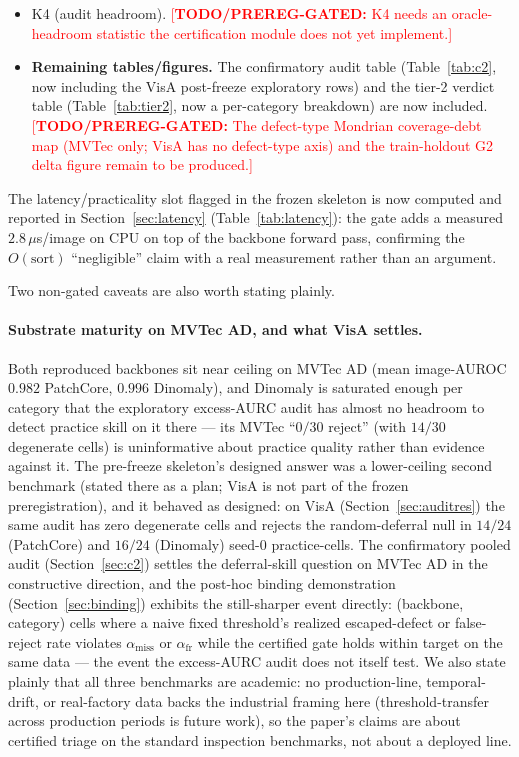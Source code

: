 \documentclass[11pt]{article}
\newcommand{\todo}[1]{\textcolor{red}{[\textbf{TODO/PREREG-GATED:} #1]}}
\begin{document}
\begin{itemize}
        2026-07-11 freeze therefore predates this execution by design; running K6 after the freeze is
        the intended sequencing, not an inconsistency.
  \item K4 (audit headroom).
        \todo{K4 needs an oracle-headroom statistic the certification module does not yet implement.}
  \item \textbf{Remaining tables/figures.} The confirmatory audit table (Table~\ref{tab:c2}, now
        including the VisA post-freeze exploratory rows) and the tier-2 verdict table
        (Table~\ref{tab:tier2}, now a per-category breakdown) are now included.
        \todo{The defect-type Mondrian coverage-debt map (MVTec only; VisA has no defect-type axis)
        and the train-holdout G2 delta figure remain to be produced.}
\end{itemize}

The latency/practicality slot flagged in the frozen skeleton is now computed and reported in
Section~\ref{sec:latency} (Table~\ref{tab:latency}): the gate adds a measured $2.8\,\mu$s/image on
CPU on top of the backbone forward pass, confirming the $O(\text{sort})$ ``negligible'' claim with
a real measurement rather than an argument.

Two non-gated caveats are also worth stating plainly.

\paragraph{Substrate maturity on MVTec AD, and what VisA settles.} Both reproduced backbones sit
near ceiling on MVTec AD (mean image-AUROC $0.982$ PatchCore, $0.996$ Dinomaly), and Dinomaly is
saturated enough per category that the exploratory excess-AURC audit has almost no headroom to
detect practice skill on it there --- its MVTec ``$0/30$ reject'' (with $14/30$ degenerate cells)
is uninformative about practice quality rather than evidence against it. The pre-freeze
skeleton's designed answer was a lower-ceiling second benchmark (stated there as a plan; VisA is
not part of the frozen preregistration), and it behaved as designed: on VisA
(Section~\ref{sec:auditres}) the same audit has zero degenerate cells and rejects the
random-deferral null in $14/24$ (PatchCore) and $16/24$ (Dinomaly) seed-$0$ practice-cells. The
confirmatory pooled audit (Section~\ref{sec:c2}) settles the deferral-skill question on MVTec AD
in the constructive direction, and the post-hoc binding demonstration (Section~\ref{sec:binding})
exhibits the still-sharper event directly: (backbone, category) cells where a naive fixed
threshold's realized escaped-defect or false-reject rate violates $\alpha_{\text{miss}}$ or
$\alpha_{\text{fr}}$ while the certified gate holds within target on the same data --- the event the
excess-AURC audit does not itself test. We
also state plainly that all three benchmarks are academic: no production-line, temporal-drift, or
real-factory data backs the industrial framing here (threshold-transfer across production
periods is future work), so the paper's claims are about certified triage on the standard
inspection benchmarks, not about a deployed line.
\end{document}
